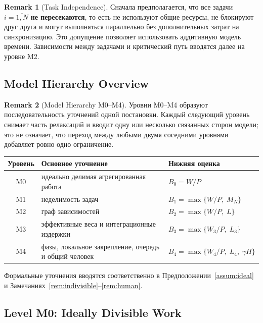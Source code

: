 \documentclass[12pt,a4paper]{article}
\theoremstyle{definition}
\newtheorem{remark}{Remark}
\begin{document}
\begin{remark}[Task Independence]\label{rem:independent}
Сначала предполагается, что все задачи $i = \overline{1,N}$ \textbf{не пересекаются}, то есть не используют общие ресурсы, не блокируют друг друга и могут выполняться параллельно без дополнительных затрат на синхронизацию. Это допущение позволяет использовать аддитивную модель времени. Зависимости между задачами и критический путь вводятся далее на уровне M2.
\end{remark}

\subsection{Model Hierarchy Overview}

\begin{remark}[Model Hierarchy M0--M4]\label{rem:hierarchy}
Уровни M0--M4 образуют последовательность уточнений одной постановки. Каждый
следующий уровень снимает часть релаксаций и вводит одну или несколько
связанных сторон модели; это не означает, что переход между любыми двумя
соседними уровнями добавляет ровно одно ограничение.

\begin{center}
\small
\begin{tabularx}{\textwidth}{@{}c>{\raggedright\arraybackslash}X>{\raggedright\arraybackslash}p{}@{}}
\toprule
Уровень & Основное уточнение & Нижняя оценка \\
\midrule
M0 & идеально делимая агрегированная работа & $B_0 = W/P$ \\
M1 & неделимость задач & $B_1 = \max\{W/P,\; M_N\}$ \\
M2 & граф зависимостей & $B_2 = \max\{W/P,\; L\}$ \\
M3 & эффективные веса и интеграционные издержки & $B_3 = \max\{W_3/P,\; L_3\}$ \\
M4 & фазы, локальное закрепление, очередь и общий человек & $B_4 = \max\{W_4/P,\; L_4,\; \gamma H\}$ \\
\bottomrule
\end{tabularx}
\end{center}

Формальные уточнения вводятся соответственно в
Предположении~\ref{assum:ideal} и
Замечаниях~\ref{rem:indivisible}--\ref{rem:human}.
\end{remark}

\subsection{Level M0: Ideally Divisible Work}
\end{document}
